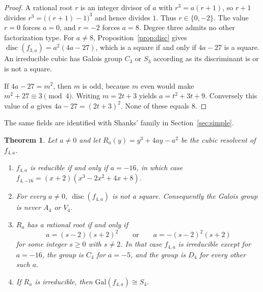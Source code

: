 \documentclass[11pt]{article}
\newtheorem{theorem}{Theorem}
\theoremstyle{definition}
\theoremstyle{remark}
\newcommand{\Gal}{\mathrm{Gal}}
\newcommand{\disc}{\operatorname{disc}}
\begin{document}
\begin{proof}
A rational root $r$ is an integer divisor of $a$ with $r^{3}=a(r+1)$, so $r+1$
divides $r^{3}=\bigl((r+1)-1\bigr)^{3}$ and hence divides $1$. Thus $r\in\{0,-2\}$.
The value $r=0$ forces $a=0$, and $r=-2$ forces $a=8$. Degree three admits no
other factorization type. For $a\neq 8$, Proposition~\ref{prop:disc} gives
$\disc(f_{3,a})=a^{2}(4a-27)$, which is a square if and only if $4a-27$ is a
square. An irreducible cubic has Galois group $C_3$ or $S_3$ according as its
discriminant is or is not a square.

If $4a-27=m^{2}$, then $m$ is odd, because $m$ even would make $m^{2}+27\equiv 3\pmod 4$.
Writing $m=2t+3$ yields $a=t^{2}+3t+9$. Conversely this value of $a$ gives
$4a-27=(2t+3)^{2}$. None of these equals $8$.
\end{proof}

The same fields are identified with Shanks' family in Section~\ref{sec:simple}.

\begin{theorem}\label{thm:gal4}
Let $a\neq 0$ and let $R_a(y)=y^{3}+4ay-a^{2}$ be the cubic resolvent of
$f_{4,a}$.
\begin{enumerate}[label=\textup{(\roman*)}]
\item $f_{4,a}$ is reducible if and only if $a=-16$, in which case
$f_{4,-16}=(x+2)(x^{3}-2x^{2}+4x+8)$.
\item For every $a\neq 0$, $\disc(f_{4,a})$ is not a square. Consequently the
Galois group is never $A_4$ or $V_4$.
\item $R_a$ has a rational root if and only if
\[
a=(s-2)(s+2)^{2}\qquad\text{or}\qquad a=-(s-2)^{2}(s+2)
\]
for some integer $s\ge 0$ with $s\neq 2$. In that case $f_{4,a}$ is irreducible
except for $a=-16$, the group is $C_4$ for $a=-5$, and the group is $D_4$ for
every other such $a$.
\item If $R_a$ is irreducible, then $\Gal(f_{4,a})\cong S_4$.
\end{enumerate}
\end{theorem}
\end{document}
